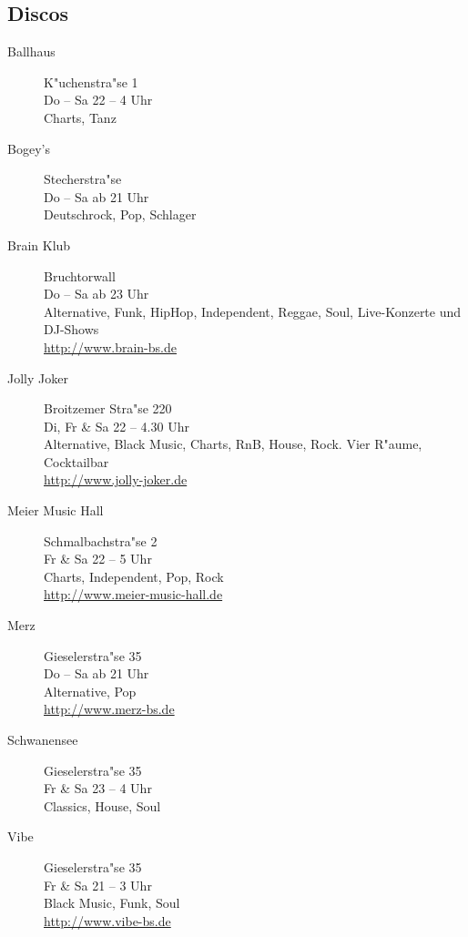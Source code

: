 \subsection{Discos}

\begin{description}
\item[Ballhaus] \hfill K"uchenstra"se 1\\
Do -- Sa \hfill 22 -- 4 Uhr\\
Charts, Tanz

\item[Bogey's] \hfill Stecherstra"se\\
Do -- Sa \hfill ab 21 Uhr\\
Deutschrock, Pop, Schlager

\item[Brain Klub] \hfill Bruchtorwall\\
Do -- Sa \hfill ab 23 Uhr\\
Alternative, Funk, HipHop, Independent, Reggae, Soul, Live-Konzerte und DJ-Shows\\
\url{http://www.brain-bs.de}

\item[Jolly Joker] \hfill Broitzemer Stra"se 220\\
Di, Fr \& Sa \hfill 22 -- 4.30 Uhr\\
Alternative, Black Music, Charts, RnB, House, Rock. Vier R"aume, Cocktailbar\\
\url{http://www.jolly-joker.de}

\item[Meier Music Hall] \hfill Schmalbachstra"se 2\\
Fr \& Sa \hfill 22 -- 5 Uhr\\
Charts, Independent, Pop, Rock\\
\url{http://www.meier-music-hall.de}

\item[Merz] \hfill Gieselerstra"se 35\\
Do -- Sa \hfill ab 21 Uhr\\
Alternative, Pop\\
\url{http://www.merz-bs.de}

\item[Schwanensee] \hfill Gieselerstra"se 35\\
Fr \& Sa \hfill 23 -- 4 Uhr\\
Classics, House, Soul

\item[Vibe] \hfill Gieselerstra"se 35\\
Fr \& Sa \hfill 21 -- 3 Uhr\\
Black Music, Funk, Soul\\
\url{http://www.vibe-bs.de}

\end{description}


